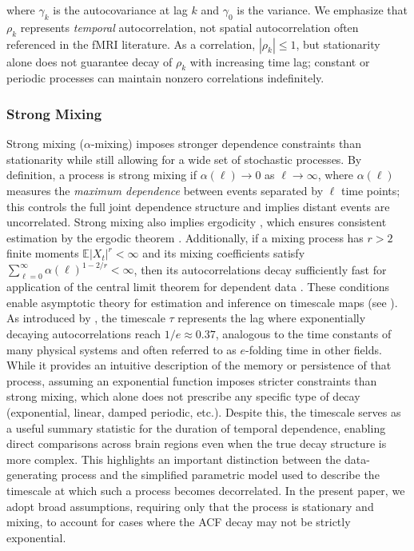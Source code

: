 \documentclass[9pt]{article}
\begin{document}
\noindent where $\gamma_k$ is the autocovariance at lag $k$ and $\gamma_0$ is the variance. We emphasize that $\rho_k$ represents \textit{temporal} autocorrelation, not spatial autocorrelation often referenced in the fMRI literature. As a correlation, $|\rho_k|\le 1$, but stationarity alone does not guarantee decay of $\rho_k$ with increasing time lag; constant or periodic processes can maintain nonzero correlations indefinitely. 

\subsubsection{Strong Mixing} \label{sec:strong-mixing}
Strong mixing ($\alpha$-mixing) imposes stronger dependence constraints than stationarity while still allowing for a wide set of stochastic processes. By definition, a process is strong mixing if $\alpha(\ell) \rightarrow 0$ as $\ell \rightarrow \infty$, where $\alpha(\ell)$ measures the \emph{maximum dependence} between events separated by $\ell$ time points; this controls the full joint dependence structure and implies distant events are uncorrelated. Strong mixing also implies ergodicity \citep[Chapter~14.12]{hansen_econometrics_2022}, which ensures consistent estimation by the ergodic theorem \citep[Theorem~14.9]{hansen_econometrics_2022}. Additionally, if a mixing process has $r>2$ finite moments $\mathbb{E}|X_t|^r < \infty$ and its mixing coefficients satisfy $\sum_{\ell=0}^{\infty} \alpha(\ell)^{1-2/r} < \infty$, then its autocorrelations decay sufficiently fast for application of the central limit theorem for dependent data \citep[Theorem~14.15]{hansen_econometrics_2022}. These conditions enable asymptotic theory for estimation and inference on timescale maps (see ).\\

As introduced by \citet{murray_hierarchy_2014}, the timescale $\tau$ represents the lag where exponentially decaying autocorrelations reach $1/e \approx 0.37$, analogous to the time constants of many physical systems and often referred to as $e$-folding time in other fields. While it provides an intuitive description of the memory or persistence of that process, assuming an exponential function imposes stricter constraints than strong mixing, which alone does not prescribe any specific type of decay (exponential, linear, damped periodic, etc.). Despite this, the timescale serves as a useful summary statistic for the duration of temporal dependence, enabling direct comparisons across brain regions even when the true decay structure is more complex. This highlights an important distinction between the data-generating process and the simplified parametric model used to describe the timescale at which such a process becomes decorrelated. In the present paper, we adopt broad assumptions, requiring only that the process is stationary and mixing, to account for cases where the ACF decay may not be strictly exponential.
\end{document}
